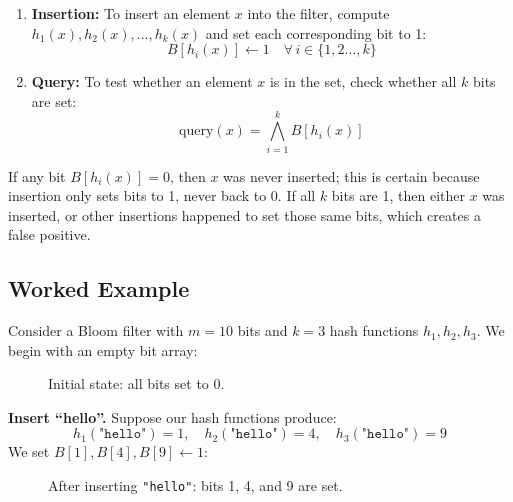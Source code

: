 \begin{enumerate}
  \item \textbf{Insertion:} To insert an element $x$ into the filter, compute 
$h_1(x), h_2(x), \dots, h_k(x)$ and set each corresponding bit to 1:
\[
  B[h_i(x)] \leftarrow 1 \quad \forall \, i \in \{1, 2 \dots, k\}
\]
\item \textbf{Query:} To test whether an element $x$ is in the set, check 
whether all $k$ bits are set:
\[
  \text{query}(x) = \bigwedge_{i=1}^{k} B[h_i(x)]
\]

\end{enumerate}



If any bit $B[h_i(x)] = 0$, then $x$ was never inserted; this is 
certain because insertion only sets bits to 1, never back to 0. If all 
$k$ bits are 1, then either $x$ was inserted, or other insertions 
happened to set those same bits, which creates a false positive.

\subsection{Worked Example}

Consider a Bloom filter with $m = 10$ bits and $k = 3$ hash functions 
$h_1, h_2, h_3$. We begin with an empty bit array:

\begin{figure}[H]
  \centering
  \caption{Initial state: all bits set to 0.}
  \label{fig:bloom-empty}
\end{figure}

\textbf{Insert ``hello''.} Suppose our hash functions produce:
\[
  h_1(\texttt{"hello"}) = 1, \quad 
  h_2(\texttt{"hello"}) = 4, \quad 
  h_3(\texttt{"hello"}) = 9
\]
We set $B[1], B[4], B[9] \leftarrow 1$:

\begin{figure}[H]
  \centering
  \caption{After inserting \texttt{"hello"}: bits 1, 4, and 9 are set.}
  \label{fig:bloom-insert-hello}
\end{figure}

